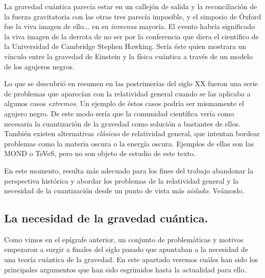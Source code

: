 \documentclass[11pt,a4paper,titlepage]{article}
\begin{document}
\par La gravedad cuántica parecía estar en un callejón de salida y la reconciliación de la fuerza gravitatoria con las otras tres parecía imposible, y el simposio de Óxford fue la viva imagen de ello... en su \textit{inmensa} mayoría. El evento habría significado la viva imagen de la derrota de no ser por la conferencia que diera el científico de la Universidad de Cambridge Stephen Hawking. Sería éste quien mostrara un vínculo entre la gravedad de Einstein y la física cuántica a través de un modelo de los agujeros negros.
\\\par Lo que se descubrió en resumen en las postrimerías del siglo XX fueron una serie de problemas que aparecían con la relatividad general cuando se las aplicaba a algunos casos \textit{extremos}. Un ejemplo de éstos casos podría ser mismamente el agujero negro. De este modo sería que la comunidad científica vería como necesaria la cuantización de la gravedad como solución a bastantes de ellos. También existen alternativas \textit{clásicas} de relatividad general, que intentan bordear problemas como la materia oscura o la energía oscura. Ejemplos de ellas son las MOND o TeVeS, pero no son objeto de estudio de este texto.
\par En este momento, resulta más adecuado para los fines del trabajo abandonar la perspectiva histórica y abordar los problemas de la relatividad general y la necesidad de la cuantización desde un punto de vista más \textit{aislado}. Veámoslo.



%
%
%
%
\subsection{La necesidad de la gravedad cuántica.}
\par Como vimos en el epígrafe anterior, un conjunto de problemáticas y motivos empezaron a surgir a finales del siglo pasado que apuntaban a la necesidad de una teoría cuántica de la gravedad. En este apartado veremos cuáles han sido los principales argumentos que han sido esgrimidos hasta la actualidad para ello.
\end{document}

